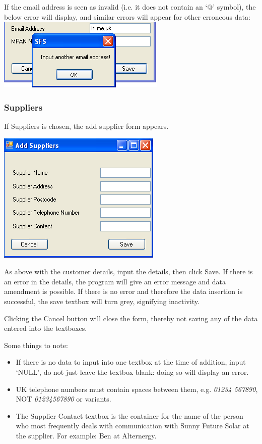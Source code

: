 		If the email address is seen as invalid (i.e. it does not contain an `@' symbol), the below error will display, and similar errors will appear for other erroneous data:
		\includegraphics[scale=0.5]{test6dot2scrot}
		
		\subsubsection{Suppliers}
		
		If Suppliers is chosen, the add supplier form appears.
		
		\includegraphics[scale=0.5]{frmAddSupplier_scrot}
		
		As above with the customer details, input the details, then click Save.  If there is an error in the details, the program will give an error message and data amendment is possible.  If there is no error and therefore the data insertion is successful, the save textbox will turn grey, signifying inactivity.
		
		Clicking the Cancel button will close the form, thereby not saving any of the data entered into the textboxes.
		
		Some things to note:
		
		\begin{itemize}
			\item{If there is no data to input into one textbox at the time of addition, input `NULL', do not just leave the textbox blank: doing so will display an error.}
			\item{UK telephone numbers must contain spaces between them, e.g. \textsl{01234 567890}, \textsc{NOT} \textsl{01234567890} or variants.}
			\item{The Supplier Contact textbox is the container for the name of the person who most frequently deals with communication with Sunny Future Solar at the supplier.  For example: Ben at Alternergy.}
		\end{itemize}
		
